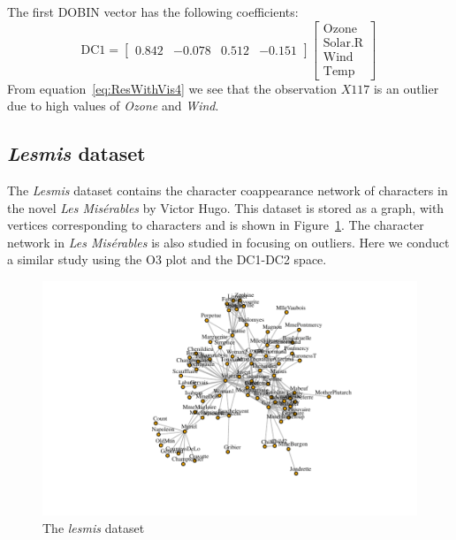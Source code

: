 \documentclass[a4paper,11pt]{article}
\begin{document}
The first DOBIN vector has the following coefficients:
\begin{equation}\label{eq:ResWithVis4}
    \text{DC1} = \begin{bmatrix}
    0.842 & -0.078 &  0.512 & -0.151
    \end{bmatrix}
    \begin{bmatrix}
    \text{Ozone} \\
    \text{Solar.R} \\
    \text{Wind} \\
    \text{Temp}
    \end{bmatrix} \,
\end{equation}
From equation~\eqref{eq:ResWithVis4} we see that the observation $X117$ is an outlier due to high values of \textit{Ozone} and \textit{Wind}.

\subsection{\textit{Lesmis} dataset}\label{sec:ResWithVis5}
The \textit{Lesmis} dataset \citep{sombrero} contains the character coappearance network of characters in the novel \textit{Les Mis\'erables} by Victor Hugo. This dataset is stored as a graph, with vertices corresponding to characters and is shown in Figure~\ref{fig:lesmisgraph}. The character network in \textit{Les Mis\'erables} is also studied in \cite{wilkinson2017visualizing} focusing on outliers. Here we conduct a similar study using the O3 plot and the DC1-DC2 space.

\begin{figure}[!ht]
	\centering
	\includegraphics{lesmis.pdf}
	\caption{The \textit{lesmis} dataset }
	\label{fig:lesmisgraph}
\end{figure}
\end{document}
